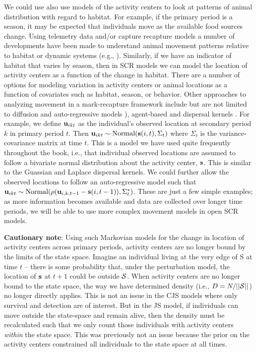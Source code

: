 We could use also use models of the activity centers to look at patterns of
animal distribution
with regard to habitat.  For example, if the primary period is a
season, it may be expected that individuals move as the available food
sources change. Using telemetry data and/or capture recapture models a
number of developments have been made to understand animal movement
patterns relative to habitat or dynamic systems (e.g.,
\cite{jonsen_etal:2005, hooten_wikle:2010}).  Similarly, if we have an
indicator of habitat that varies by season, then in SCR models we can
model the location of activity centers as a function of the change in
habitat.  There are a number of options for modeling variation in
activity centers or animal locations as a function of covariates such
as habitat, season, or behavior.  Other approaches to analyzing
movement in a mark-recapture framework include but are not limited to
diffusion and auto-regressive models \citep{ovaskainen:2004,
  ovaskainen_etal:2008}), agent-based \citep{grimm_etal:2005,
  hooten_etal:2010} and dispersal kernels
\citep{fujiwara_etal:2006}.  For example, we define ${\bf u}_{ikt}$ as the
individual's observed location at secondary period $k$ in primary
period $t$.
Then ${\bf u}_{ikt} \sim \mbox{Normal}({\bf s}(i,t), \Sigma_t)$ where
$\Sigma_t$ is the variance-covariance matrix at time $t$.  This is a
model we have used quite frequently throughout the book, i.e., that
individual observed locations are assumed to follow a bivariate normal
distribution about the activity center, ${\bf s}$. 
This is similar to
the Guassian and Laplace dispersal kernels.  We could further allow the
observed locations to follow an auto-regressive model such that ${\bf
  u}_{ikt} \sim \mbox{Normal}(\rho ({\bf u}_{i,k,t-1} - {\bf
  s}(i,t-1)), \Sigma^{*}_t)$.  These are just a few simple examples; as
more information becomes available and data are collected over longer
time periods, we will be able to use more complex movement models in open SCR models.



{\flushleft \bf Cautionary note}: 
Using such Markovian models for the change in location of activity centers across primary periods, 
activity centers are no longer bound by the limits of the state space. 
Imagine an individual living at the very edge of S at time $t$ -- there is some probability that, 
under the perturbation model, the location of ${\bf s}$ at $t+1$ could be outside ${\cal S}$.
When activity centers are no longer bound to the state space,
the way we have determined density (i.e., $D = N/||{\cal S}||$) no longer directly applies.
This is not an issue in the CJS models where only survival and detection are of interest.  But
in the JS model, if individuals can move outside the state-space and remain alive, then
the density must be recalculated such that we only count those individuals with activity centers
{\it within} the state space.  This was previously not an issue because the prior on the activity 
centers constrained all individuals to the state space at all times.  

